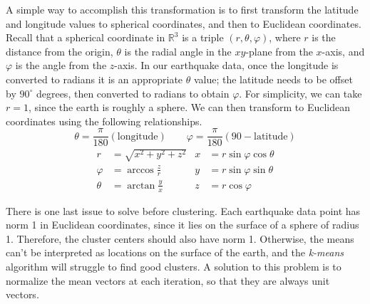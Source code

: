 A simple way to accomplish this transformation is to first transform the latitude and longitude values to spherical coordinates, and then to Euclidean coordinates.
Recall that a spherical coordinate in $\mathbb{R}^3$ is a triple $(r,\theta,\varphi)$, where $r$ is the distance from the origin, $\theta$ is the radial angle in the $xy$-plane from the $x$-axis, and $\varphi$ is the angle from the $z$-axis.
In our earthquake data, once the longitude is converted to radians it is an appropriate $\theta$ value; the latitude needs to be offset by $90^\circ$ degrees, then converted to radians to obtain $\varphi$.
For simplicity, we can take $r=1$, since the earth is roughly a sphere.
We can then transform to Euclidean coordinates using the following relationships.
\[
\theta = \frac{\pi}{180}\left(\text{longitude}\right)
\qquad
\varphi = \frac{\pi}{180}\left(90 - \text{latitude}\right)
\]
\begin{align*}
r & = \sqrt{x^{2} + y^{2} + z^{2}} & x & = r \sin \varphi \cos \theta \\
\varphi & = \arccos \frac{z}{r} & y & = r \sin \varphi \sin \theta \\
\theta & = \arctan \frac{y}{x} & z & = r \cos \varphi
\end{align*}

There is one last issue to solve before clustering.
Each earthquake data point has norm 1 in Euclidean coordinates, since it lies on the surface of a sphere of radius 1.
Therefore, the cluster centers should also have norm 1.
Otherwise, the means can't be interpreted as locations on the surface of the earth, and the \emph{k-means} algorithm will struggle to find good clusters.
A solution to this problem is to normalize the mean vectors at each iteration, so that they are always unit vectors.

